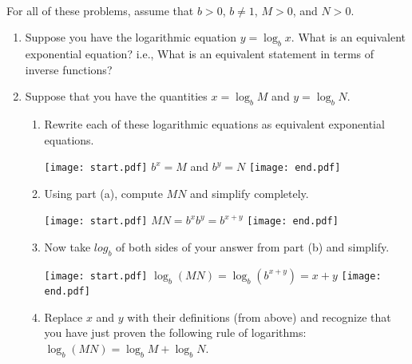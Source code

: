 \\
For all of these problems, assume that $b>0$, $b \neq 1$, $M>0$, and $N>0$.

\begin{enumerate}

\item Suppose you have the logarithmic equation $y=\log_b{x}$.  What is an equivalent exponential equation?  i.e., What is an equivalent statement in terms of inverse functions?

\item Suppose that you have the quantities $x=\log_b{M}$ and $y=\log_b{N}$.

\begin{enumerate}

\item Rewrite each of these logarithmic equations as equivalent exponential equations.

\texttt{[image: start.pdf]}
{{$b^x=M$ and $b^y=N$}}
\texttt{[image: end.pdf]}


\item Using part (a), compute $MN$ and simplify completely.

\texttt{[image: start.pdf]}
{{$MN=b^xb^y=b^{x+y}$}}
\texttt{[image: end.pdf]}


\item Now take $log_b$ of both sides of your answer from part (b) and simplify.

\texttt{[image: start.pdf]}
{{$\log_b{(MN)}=\log_b{(b^{x+y})}=x+y$}}
\texttt{[image: end.pdf]}


\item Replace $x$ and $y$ with their definitions (from above) and recognize that you have just proven the following rule of logarithms: $\log_b{(MN)}=\log_b{M}+\log_b{N}$.

\end{enumerate}




\end{enumerate}
